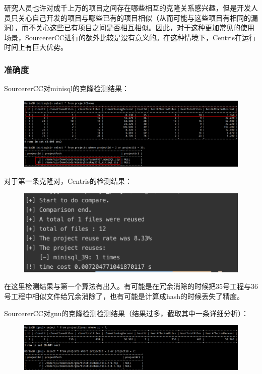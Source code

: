 \documentclass{cjc}
\begin{document}
研究人员也许对成千上万的项目之间存在哪些相互的克隆关系感兴趣，但是开发人员只关心自己开发的项目与哪些已有的项目相似（从而可能与这些项目有相同的漏洞），而不关心这些已有项目之间是否相互相似。因此，对于这种更加常见的使用场景，SourcererCC进行的额外比较是没有意义的。在这种情境下，Centris在运行时间上有巨大优势。

\subsubsection{准确度}

SourcererCC对minisql的克隆检测结果：

\begin{figure}[htb]
  \centering
  \includegraphics[width=\linewidth]{pics/image-20220624184116748.png}
\end{figure}

对于第一条克隆对，Centris的检测结果：

\begin{figure}[htb]
  \centering
  \includegraphics[width=\linewidth]{pics/centris_minisql.png}
\end{figure}

在这里检测结果与第一个算法有出入。有可能是在冗余消除的时候把35号工程与36号工程中相似文件给冗余消除了，也有可能是计算成hash的时候丢失了精度。

SourcererCC对gnu的克隆检测检测结果（结果过多，截取其中一条详细分析）：

\begin{figure}[htb]
  \centering
  \includegraphics[width=\linewidth]{pics/SourcererCC gnu.png}
\end{figure}
\end{document}

